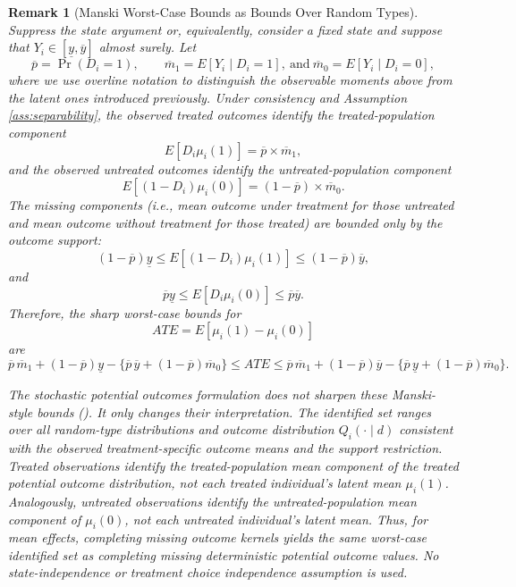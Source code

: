 \documentclass[11pt]{article}
\newtheorem{remark}{Remark}
\newcommand{\1}{\mathbf{1}}
\begin{document}
\begin{remark}[Manski Worst-Case Bounds as Bounds Over Random Types]
\label{rem:manski}
Suppress the state argument or, equivalently, consider a fixed state and suppose that
\(Y_i \in [\underline y,\overline y]\) almost surely. Let
\[
\overline{p}=\Pr(D_i=1), \qquad
\overline{m}_1=E[Y_i\mid D_i=1], ~ \textrm{and} ~
\overline{m}_0=E[Y_i\mid D_i=0],
\]
where we use overline notation to distinguish the observable moments above from the latent ones introduced previously.  Under consistency and Assumption \ref{ass:separability}, the observed treated outcomes identify
the treated-population component
\[
E[D_i\mu_i(1)] = \overline{p} \times \overline{m}_1,
\]
and the observed untreated outcomes identify the untreated-population component
\[
E[(1-D_i)\mu_i(0)] = (1-\overline{p}) \times \overline{m}_0.
\]
The missing components (i.e., mean outcome under treatment for those untreated and mean outcome without treatment for those treated) are bounded only by the outcome support:
\[
(1-\overline{p})\underline y
\le
E[(1-D_i)\mu_i(1)]
\le
(1-\overline{p})\overline y,
\]
and
\[
\overline{p}\underline y
\le
E[D_i\mu_i(0)]
\le
\overline{p}\overline y.
\]
Therefore, the sharp worst-case bounds for
\[
ATE = E[\mu_i(1)-\mu_i(0)]
\]
are
\[
\overline{p}\,\overline{m}_1
+(1-\overline{p})\underline y
-\{\overline{p}\,\overline y+(1-\overline{p})\overline{m}_0\}
\leq
ATE
\leq
\overline{p}\,\overline{m}_1
+(1-\overline{p})\overline y
-\{\overline{p}\,\underline y+(1-\overline{p})\overline{m}_0\}.
\]

\noindent The stochastic potential outcomes formulation does not sharpen these Manski-style bounds (\cite{Manski2003,Manski1990}).
It only changes their interpretation. The identified set ranges over all random-type
distributions and outcome distribution  \(Q_i(\cdot\mid d)\) consistent with the observed
treatment-specific outcome means and the support restriction. Treated observations identify
the treated-population mean component of the treated potential outcome distribution, not each
treated individual's latent mean \(\mu_i(1)\). Analogously, untreated observations identify the
untreated-population mean component of \(\mu_i(0)\), not each untreated individual's latent
mean. Thus, for mean effects, completing missing outcome kernels yields the same worst-case
identified set as completing missing deterministic potential outcome values. No state-independence or
treatment choice independence assumption is used.
\end{remark}
\end{document}
